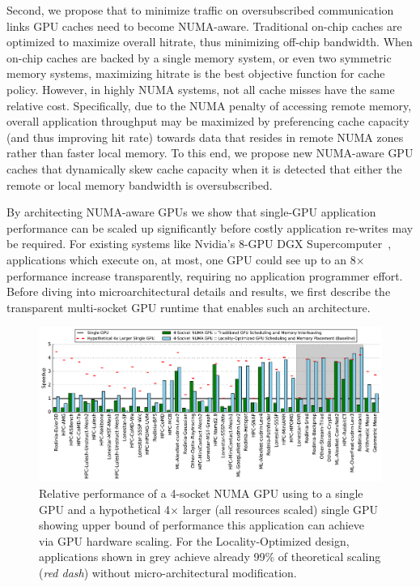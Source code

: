 Second, we propose that to minimize traffic on oversubscribed communication 
links GPU caches need to become NUMA-aware.  Traditional on-chip caches are 
optimized to maximize overall hitrate, thus minimizing off-chip bandwidth.  When 
on-chip caches are backed by a single memory system, or even two symmetric 
memory systems, maximizing hitrate is the best objective function for cache 
policy.  However, in highly NUMA systems,  not all cache misses have the same 
relative cost.  Specifically, due to the NUMA penalty of accessing remote 
memory, overall application throughput may be maximized by preferencing cache 
capacity (and thus improving hit rate) towards data that resides in remote NUMA 
zones rather than faster local memory. To this end, we propose new NUMA-aware 
GPU caches that dynamically skew cache capacity when it is detected that either 
the remote or local memory bandwidth is oversubscribed.

By architecting NUMA-aware GPUs we show that single-GPU application performance 
can be scaled up significantly before costly application re-writes may be 
required. For existing systems like Nvidia's 8-GPU DGX 
Supercomputer~\cite{dgx}, applications which execute on, at most, one GPU could 
see up to an 8$\times$ performance increase transparently, requiring no 
application programmer effort. Before diving into microarchitectural details and 
results, we first describe the transparent multi-socket GPU runtime that enables 
such an architecture.

\begin{figure}[tp] 
    \centering
    \includegraphics[width=1.0\linewidth]{figures/plot_different_baselines.pdf}
    \caption{Relative performance of a 4-socket NUMA GPU using to a single GPU 
and a hypothetical 4$\times$ larger (all resources scaled) single GPU showing 
upper bound of performance this application can achieve via GPU hardware 
scaling. For the Locality-Optimized design, applications shown in grey 
achieve already 99\% of theoretical scaling (\emph{red dash}) without 
micro-architectural modification.}
    \label{fig:motivation}
\end{figure}

